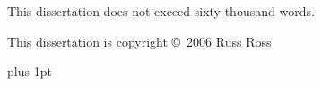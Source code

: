 \noindent This dissertation does not exceed sixty thousand words.

\vfill

\noindent This dissertation is copyright \copyright~2006 Russ Ross

\cleardoublepage



\pagestyle{plain}
\enlargethispage*{60cm}        %

{}
\cleardoublepage

%

%        
%


%

{
  \parskip 0pt plus 1pt
  \tableofcontents
}

\cleardoublepage

%

% 

%

% 

%

% 

%

%  


